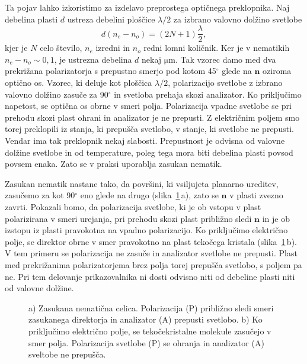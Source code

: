 Ta pojav lahko izkoristimo za izdelavo preprostega optičnega preklopnika. 
Naj debelina plasti $d$ ustreza debelini ploščice $\lambda/2$ 
za izbrano valovno dolžino svetlobe 
\begin{equation}
d(n_{e}-n_{o})=(2N+1)\frac{\lambda}{2},
\label{7.57}
\end{equation}
kjer je $N$ celo število, $n_e$ izredni in $n_o$ redni 
lomni količnik. Ker je v nematikih $n_{e}-n_{o}\sim0,1$, 
je ustrezna debelina $d$ nekaj $\si{\micro\metre}$. Tak vzorec damo med dva prekrižana 
polarizatorja s prepustno smerjo pod kotom 45$^\circ$ glede na $\mathbf{n}$
oziroma optično os. Vzorec, ki deluje kot ploščica $\lambda/2$, 
polarizacijo svetlobe z izbrano valovno dolžino zasuče za 90$^\circ$ in 
svetloba prehaja skozi analizator. Ko
priključimo napetost, se optična os obrne v smeri polja. Polarizacija vpadne 
svetlobe se pri prehodu skozi plast ohrani in 
analizator je ne prepusti. Z električnim poljem smo torej preklopili iz
stanja, ki prepušča svetlobo, v stanje, ki svetlobe ne prepusti.
Vendar ima tak preklopnik nekaj slabosti. Prepustnost je odvisna
od valovne dolžine svetlobe in od temperature, poleg tega mora biti debelina 
plasti povsod povsem enaka. Zato se v praksi uporablja zasukan nematik. 

Zasukan  nematik nastane tako, da površini, ki vsiljujeta planarno ureditev,
zasučemo za kot 90$^\circ$ eno glede na drugo (slika~\ref{LCD1}\,a), zato se $\mathbf{n}$ 
v plasti zvezno zavrti.
Pokazali bomo, da polarizacija svetlobe, ki je ob vstopu 
v plast polarizirana v smeri urejanja, pri prehodu skozi plast približno
sledi $\mathbf{n}$ in je ob izstopu iz plasti pravokotna
na vpadno polarizacijo. Ko priključimo električno polje, se direktor 
obrne v smer pravokotno na plast tekočega kristala (slika~\ref{LCD1}\,b). V tem primeru 
se polarizacija ne zasuče in analizator svetlobe ne prepusti. Plast med prekrižanima
polarizatorjema brez polja torej prepušča svetlobo, s poljem pa ne. Pri tem
delovanje prikazovalnika ni dosti odvisno niti od debeline plasti niti
od valovne dolžine. 
\begin{figure}[h!]
\centering
\def\svgwidth{105truemm} 

\caption{a) Zasukana nematična celica. 
Polarizacija (P) približno sledi smeri zasukanega direktorja in analizator (A) 
prepusti svetlobo. b) Ko priključimo električno polje, se tekočekristalne molekule
zasučejo v smer polja. Polarizacija svetlobe (P) se ohranja in analizator (A) 
sveltobe ne prepušča. }
\label{LCD1}
\end{figure}

